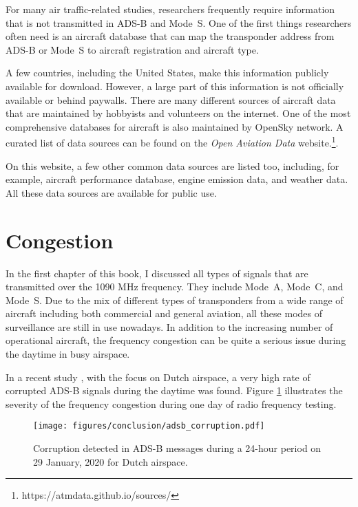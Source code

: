 For many air traffic-related studies, researchers frequently require information that is not transmitted in ADS-B and Mode~S. One of the first things researchers often need is an aircraft database that can map the transponder address from ADS-B or Mode~S to aircraft registration and aircraft type. 

A few countries, including the United States, make this information publicly available for download. However, a large part of this information is not officially available or behind paywalls. There are many different sources of aircraft data that are maintained by hobbyists and volunteers on the internet. One of the most comprehensive databases for aircraft is also maintained by OpenSky network. A curated list of data sources can be found on the \emph{Open Aviation Data} website.\footnote{https://atmdata.github.io/sources/}.

On this website, a few other common data sources are listed too, including, for example, aircraft performance database, engine emission data, and weather data. All these data sources are available for public use.


\section{Congestion}
In the first chapter of this book, I discussed all types of signals that are transmitted over the 1090 MHz frequency. They include Mode~A, Mode~C, and Mode~S. Due to the mix of different types of transponders from a wide range of aircraft including both commercial and general aviation, all these modes of surveillance are still in use nowadays. In addition to the increasing number of operational aircraft, the frequency congestion can be quite a serious issue during the daytime in busy airspace. 

In a recent study \cite{sun2020rf}, with the focus on Dutch airspace, a very high rate of corrupted ADS-B signals during the daytime was found. Figure \ref{fig:adsb_corruption} illustrates the severity of the frequency congestion during one day of radio frequency testing.

\begin{figure}[ht]
    \centering
    \texttt{[image: figures/conclusion/adsb\_corruption.pdf]}
    \caption{Corruption detected in ADS-B messages during a 24-hour period on 29
    January, 2020 for Dutch airspace.}
    \label{fig:adsb_corruption}
\end{figure}


